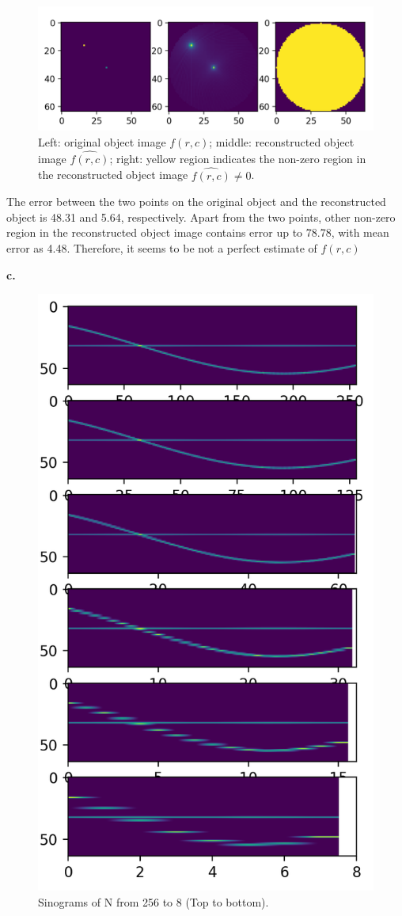 \documentclass[11pt,a4paper]{article}
\begin{document}
\begin{figure}[!ht]
    \centering
    \includegraphics[width=\linewidth]{HW2_Q3_2.png}
    \caption{Left: original object image $f(r,c)$; middle: reconstructed object image $\widehat{f(r,c)}$; right: yellow region indicates the non-zero region in the reconstructed object image $\widehat{f(r,c)}\ne 0$.}
\end{figure}

The error between the two points on the original object and the reconstructed object is 48.31 and 5.64, respectively. Apart from the two points, other non-zero region in the reconstructed object image contains error up to 78.78, with mean error as 4.48. Therefore, it seems to be not a perfect estimate of $f(r, c)$

\newpage
\textbf{c.}
\begin{figure}[!htp]
    \centering
    \includegraphics[width=0.7\linewidth]{HW2_Q3_3.1.png}
    \caption{Sinograms of N from 256 to 8 (Top to bottom).}
    \label{fig:sino}
\end{figure}
\end{document}
